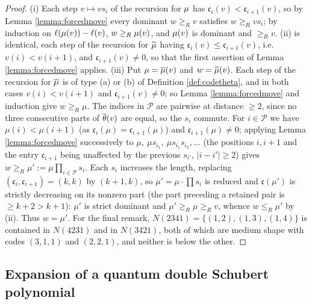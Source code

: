 \documentclass{amsart}
\theoremstyle{definition}
\theoremstyle{remark}
\numberwithin{equation}{section}
\newcommand{\code}{\mathfrak{c}}
\begin{document}
\begin{proof}
(i) Each step $v\mapsto vs_i$ of the recursion for $\mu$ has $\code_i(v)<\code_{i+1}(v)$, so by Lemma \ref{lemma:forcedmove} every dominant $w\geq_Rv$ satisfies $w\geq_Rvs_i$; by induction on $\ell(\mu(v))-\ell(v)$, $w\geq_R\mu(v)$, and $\mu(v)$ is dominant and $\geq_Rv$. (ii) is identical, each step of the recursion for $\widetilde{\mu}$ having $\code_i(v)\leq\code_{i+1}(v)$, i.e.\ $v(i)<v(i+1)$, and $\code_{i+1}(v)\neq0$, so that the first assertion of Lemma \ref{lemma:forcedmove} applies. (iii) Put $\mu=\overline{\mu}(v)$ and $w=\widetilde{\mu}(v)$. Each step of the recursion for $\overline{\mu}$ is of type (a) or (b) of Definition \ref{def:codetheta}, and in both cases $v(i)<v(i+1)$ and $\code_{i+1}(v)\neq0$; so Lemma \ref{lemma:forcedmove} and induction give $w\geq_R\mu$. The indices in $\mathcal P$ are pairwise at distance $\geq2$, since no three consecutive parts of $\overline{\theta}(v)$ are equal, so the $s_i$ commute. For $i\in\mathcal P$ we have $\mu(i)<\mu(i+1)$ (as $\code_i(\mu)=\code_{i+1}(\mu)$) and $\code_{i+1}(\mu)\neq0$; applying Lemma \ref{lemma:forcedmove} successively to $\mu,\ \mu s_{i_1},\ \mu s_{i_1}s_{i_2},\ldots$ (the positions $i,i+1$ and the entry $\code_{i+1}$ being unaffected by the previous $s_{i'}$, $|i-i'|\geq2$) gives $w\geq_R\mu':=\mu\prod_{i\in\mathcal P}s_i$. Each $s_i$ increases the length, replacing $(\code_i,\code_{i+1})=(k,k)$ by $(k+1,k)$, so $\mu'=\mu\cdot\prod s_i$ is reduced and $\code(\mu')$ is strictly decreasing on its nonzero part (the part preceding a retained pair is $\geq k+2>k+1$): $\mu'$ is strict dominant and $\mu'\geq_R\mu\geq_Rv$, whence $w\leq_R\mu'$ by (ii). Thus $w=\mu'$. For the final remark, $N(2341)=\{(1,2),(1,3),(1,4)\}$ is contained in $N(4231)$ and in $N(3421)$, both of which are medium shape with codes $(3,1,1)$ and $(2,2,1)$, and neither is below the other.
\end{proof}

\subsection{Expansion of a quantum double Schubert polynomial}
\end{document}
